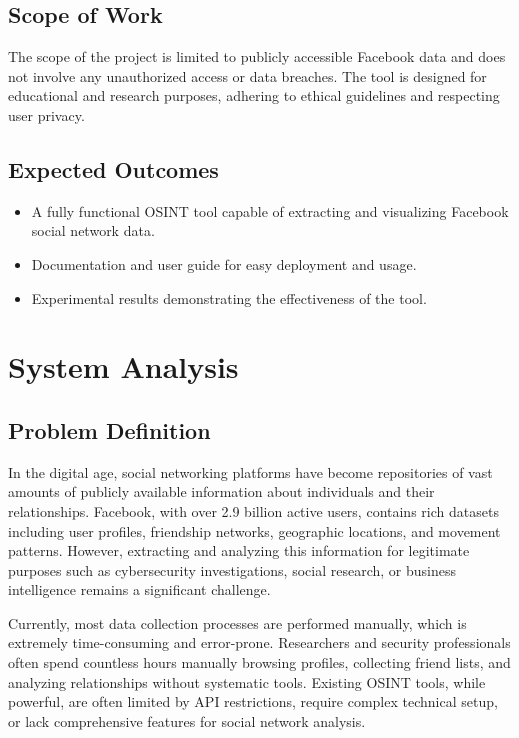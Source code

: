 \documentclass[13pt,a4paper]{report}
\begin{document}
\section{Scope of Work}
The scope of the project is limited to publicly accessible Facebook data and does not involve any unauthorized access or data breaches. The tool is designed for educational and research purposes, adhering to ethical guidelines and respecting user privacy.

\section{Expected Outcomes}
\begin{itemize}
    \item A fully functional OSINT tool capable of extracting and visualizing Facebook social network data.
    \item Documentation and user guide for easy deployment and usage.
    \item Experimental results demonstrating the effectiveness of the tool.
\end{itemize}

\chapter{System Analysis}
\section{Problem Definition}
In the digital age, social networking platforms have become repositories of vast amounts of publicly available information about individuals and their relationships. Facebook, with over 2.9 billion active users, contains rich datasets including user profiles, friendship networks, geographic locations, and movement patterns. However, extracting and analyzing this information for legitimate purposes such as cybersecurity investigations, social research, or business intelligence remains a significant challenge.

Currently, most data collection processes are performed manually, which is extremely time-consuming and error-prone. Researchers and security professionals often spend countless hours manually browsing profiles, collecting friend lists, and analyzing relationships without systematic tools. Existing OSINT tools, while powerful, are often limited by API restrictions, require complex technical setup, or lack comprehensive features for social network analysis.
\end{document}
